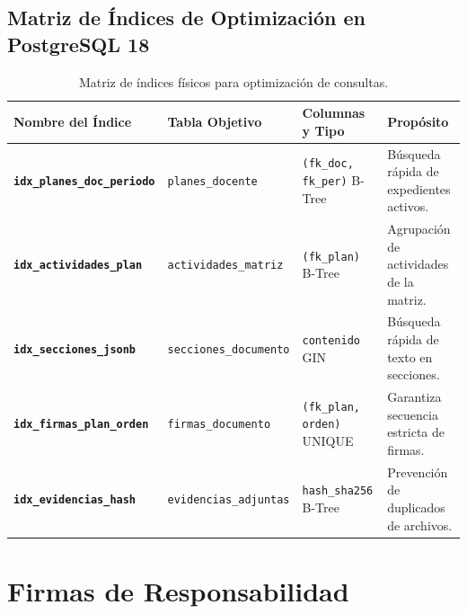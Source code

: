 \documentclass[12pt,a4paper]{article}
\begin{document}
\subsection{Matriz de Índices de Optimización en PostgreSQL 18}
\begin{table}[H]
\centering
\small
\renewcommand{\arraystretch}{1.2}
\begin{tabularx}{\textwidth}{|>{\hsize=1.25\hsize\raggedright\arraybackslash\bfseries\footnotesize}X|>{\hsize=0.85\hsize\raggedright\arraybackslash\footnotesize}X|>{\hsize=0.95\hsize\raggedright\arraybackslash\footnotesize}X|>{\hsize=0.95\hsize\raggedright\arraybackslash\footnotesize}X|}
\hline
\rowcolor{tableheader}
\textbf{Nombre del Índice} & \textbf{Tabla Objetivo} & \textbf{Columnas y Tipo} & \textbf{Propósito} \\
\hline
\texttt{idx\_\allowbreak  planes\_\allowbreak   doc\_\allowbreak  periodo} & \texttt{planes\_\allowbreak   docente} & \texttt{(fk\_\allowbreak  doc, fk\_\allowbreak  per)} B-Tree & Búsqueda rápida de expedientes activos. \\
\hline
\texttt{idx\_\allowbreak  actividades\_\allowbreak   plan} & \texttt{actividades\_\allowbreak   matriz} & \texttt{(fk\_\allowbreak  plan)} B-Tree & Agrupación de actividades de la matriz. \\
\hline
\texttt{idx\_\allowbreak  secciones\_\allowbreak   jsonb} & \texttt{secciones\_\allowbreak   documento} & \texttt{contenido} GIN & Búsqueda rápida de texto en secciones. \\
\hline
\texttt{idx\_\allowbreak  firmas\_\allowbreak   plan\_\allowbreak  orden} & \texttt{firmas\_\allowbreak   documento} & \texttt{(fk\_\allowbreak  plan, orden)} UNIQUE & Garantiza secuencia estricta de firmas. \\
\hline
\texttt{idx\_\allowbreak  evidencias\_\allowbreak   hash} & \texttt{evidencias\_\allowbreak   adjuntas} & \texttt{hash\_\allowbreak  sha256} B-Tree & Prevención de duplicados de archivos. \\
\hline
\end{tabularx}
\caption{Matriz de índices físicos para optimización de consultas.}
\end{table}

\section{Firmas de Responsabilidad}
\end{document}
